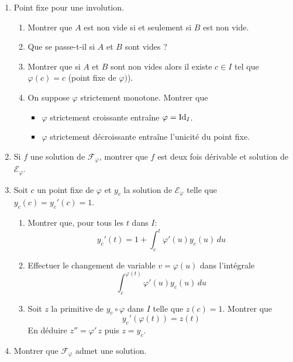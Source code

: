 \begin{enumerate}
  \item Point fixe pour une involution.
\begin{enumerate}
  \item Montrer que $A$ est non vide si et seulement si $B$ est non vide.
  \item Que se passe-t-il si $A$ et $B$ sont vides ?
  \item Montrer que si $A$ et $B$ sont non vides alors il existe $c\in I$ tel que $\varphi(c)=c$ (point fixe de $\varphi)$).
  \item On suppose $\varphi$ strictement monotone. Montrer que
\begin{itemize}
  \item $\varphi$ strictement croissante entraîne $\varphi = \operatorname{Id}_I$.
  \item $\varphi$ strictement décroissante entraîne l'unicité du point fixe.
\end{itemize}
\end{enumerate}

  \item Si $f$ une solution de $\mathcal{F}_\varphi$, montrer que $f$ est deux fois dérivable et solution de $\mathcal{E}_\varphi$.
  
  \item Soit $c$ un point fixe de $\varphi$ et $y_c$ la solution de $\mathcal{E}_\varphi$ telle que $y_c(c)=y_c'(c)=1$.
\begin{enumerate}
  \item Montrer que, pour tous les $t$ dans $I$:
\begin{displaymath}
  y_c'(t) = 1 + \int_c^t \varphi'(u)y_c(u)\, du
\end{displaymath}

  \item Effectuer le changement de variable $v = \varphi(u)$ dans l'intégrale
  \begin{displaymath}
    \int_c^{\varphi(t)}\varphi '(u)y_c(u)\,du
  \end{displaymath}
  \item Soit $z$ la primitive de $y_c \circ \varphi$ dans $I$ telle que $z(c) = 1$. Montrer que 
\begin{displaymath}
  y_c'(\varphi(t)) = z(t)
\end{displaymath}
En déduire $z'' = \varphi' \, z$ puis $z=y_c$.
\end{enumerate}
\item Montrer que $\mathcal{F}_\varphi$ admet une solution.
\end{enumerate}


